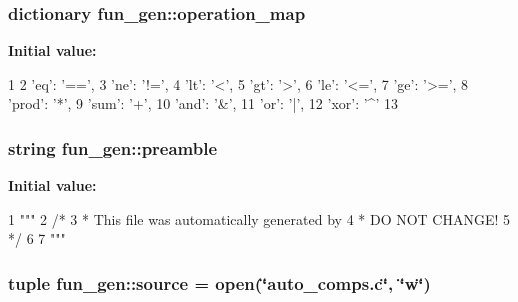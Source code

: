 \hypertarget{namespacefun__gen_ab0aa9bb5cee4f4de9db0a8276db1fc7f}{
\subsubsection[{operation\-\_\-map}]{\setlength{\rightskip}{0pt plus 5cm}dictionary {\bf fun\-\_\-gen\-::operation\-\_\-map}}}\label{namespacefun__gen_ab0aa9bb5cee4f4de9db0a8276db1fc7f}
{\bfseries \-Initial value\-:}
\begin{DoxyCode}
1 {
2     'eq': '==',
3     'ne': '!=',
4     'lt': '<',
5     'gt': '>',
6     'le': '<=',
7     'ge': '>=',
8     'prod': '*',
9     'sum': '+',
10     'and': '&',
11     'or': '|',
12     'xor': '^'
13 }
\end{DoxyCode}
\hypertarget{namespacefun__gen_ab2fbbcc4262280e33d3bd590dd2fc198}{
\subsubsection[{preamble}]{\setlength{\rightskip}{0pt plus 5cm}string {\bf fun\-\_\-gen\-::preamble}}}\label{namespacefun__gen_ab2fbbcc4262280e33d3bd590dd2fc198}
{\bfseries \-Initial value\-:}
\begin{DoxyCode}
1 """
2 /*
3  * This file was automatically generated by %
4  * DO NOT CHANGE!
5  */
6 
7 """
\end{DoxyCode}
\hypertarget{namespacefun__gen_a731fe5a5826f22d63eb10f7b75e684aa}{
\subsubsection[{source}]{\setlength{\rightskip}{0pt plus 5cm}tuple {\bf fun\-\_\-gen\-::source} = open(\char`\"{}auto\-\_\-comps.\-c\char`\"{}, \char`\"{}w\char`\"{})}}\label{namespacefun__gen_a731fe5a5826f22d63eb10f7b75e684aa}
